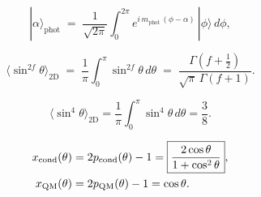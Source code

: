 \begin{equation}
  |\alpha\rangle_\mathrm{phot}
  \;=\; \frac{1}{\sqrt{2\pi}}
  \int_0^{2\pi} e^{i\,m_\mathrm{phot}\,(\phi-\alpha)}\,|\phi\rangle\,d\phi,
  \label{P9:eq:photon_state}
\end{equation}

\begin{equation}
  \langle\sin^{2f}\theta\rangle_\mathrm{2D}
  \;=\; \frac{1}{\pi}\int_0^{\pi}\sin^{2f}\theta\,d\theta
  \;=\; \frac{\Gamma(f+\tfrac{1}{2})}{\sqrt{\pi}\,\Gamma(f+1)}.
  \label{P9:eq:sin2f_avg}
\end{equation}

\begin{equation}
  \langle\sin^4\theta\rangle_\mathrm{2D}
  = \frac{1}{\pi}\int_0^{\pi}\sin^4\theta\,d\theta
  = \frac{3}{8}.
  \label{P9:eq:sin4_2D_exact}
\end{equation}

\begin{align}
  x_{\mathrm{cond}}(\theta) &= 2p_{\mathrm{cond}}(\theta) - 1
  = \boxed{\frac{2\cos\theta}{1+\cos^2\theta}}, \\
  x_\mathrm{QM}(\theta) &= 2p_{\mathrm{QM}}(\theta) - 1 = \cos\theta. 
\end{align}

